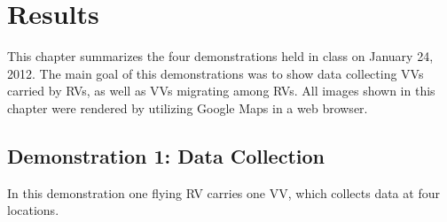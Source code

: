 
\chapter{Results}

This chapter summarizes the four demonstrations held in class on January 24, 2012. The main goal of this
demonstrations was to show data collecting \acp{VV} carried by \acp{RV}, as well as \acp{VV} migrating
among \acp{RV}. All images shown in this chapter were rendered by utilizing Google Maps \cite{GOOGLEMAPS2012} in a web browser.


\section{Demonstration 1: Data Collection}
In this demonstration one flying \ac{RV} carries one \ac{VV}, which collects data at four locations.
